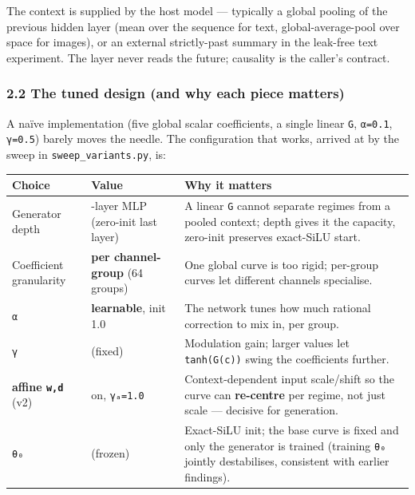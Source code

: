 \documentclass[
  11pt,
]{article}
\newcounter{none} %
\begin{document}
The context is supplied by the host model --- typically a global pooling
of the previous hidden layer (mean over the sequence for text,
global-average-pool over space for images), or an external strictly-past
summary in the leak-free text experiment. The layer never reads the
future; causality is the caller's contract.

\subsubsection{2.2 The tuned design (and why each piece
matters)}\label{the-tuned-design-and-why-each-piece-matters}

A naïve implementation (five global scalar coefficients, a single linear
\texttt{G}, \texttt{α=0.1}, \texttt{γ=0.5}) barely moves the needle. The
configuration that works, arrived at by the sweep in
\texttt{sweep\_variants.py}, is:

{\def\LTcaptype{none} %
\begin{longtable}[]{@{}
  >{\raggedright\arraybackslash}p{}
  >{\raggedright\arraybackslash}p{}
  >{\raggedright\arraybackslash}p{}@{}}
\toprule\noalign{}
\begin{minipage}[b]{\linewidth}\raggedright
Choice
\end{minipage} & \begin{minipage}[b]{\linewidth}\raggedright
Value
\end{minipage} & \begin{minipage}[b]{\linewidth}\raggedright
Why it matters
\end{minipage} \\
\midrule\noalign{}
\endhead
\bottomrule\noalign{}
\endlastfoot
Generator depth & 2-layer MLP (zero-init last layer) & A linear
\texttt{G} cannot separate regimes from a pooled context; depth gives it
the capacity, zero-init preserves exact-SiLU start. \\
Coefficient granularity & \textbf{per channel-group} (64 groups) & One
global curve is too rigid; per-group curves let different channels
specialise. \\
\texttt{α} & \textbf{learnable}, init 1.0 & The network tunes how much
rational correction to mix in, per group. \\
\texttt{γ} & 2.0 (fixed) & Modulation gain; larger values let
\texttt{tanh(G(c))} swing the coefficients further. \\
\textbf{affine \texttt{w,d}} (v2) & on, \texttt{γₐ=1.0} &
Context-dependent input scale/shift so the curve can \textbf{re-centre}
per regime, not just scale --- decisive for generation. \\
\texttt{θ₀} & 0 (frozen) & Exact-SiLU init; the base curve is fixed and
only the generator is trained (training \texttt{θ₀} jointly
destabilises, consistent with earlier findings). \\
\end{longtable}
}
\end{document}

